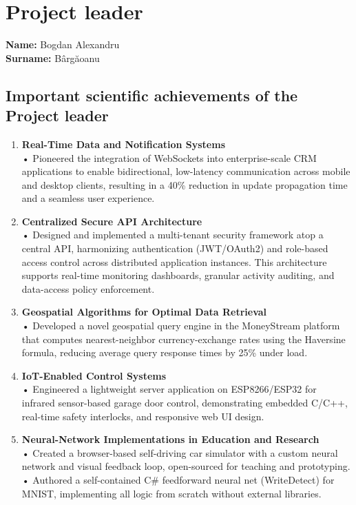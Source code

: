 \chapter{Project leader}

\noindent
\textbf{Name:} Bogdan Alexandru\\
\textbf{Surname:} Bârgăoanu

\section{Important scientific achievements of the Project leader}

\begin{enumerate}
    \item \textbf{Real-Time Data and Notification Systems} \\
    • Pioneered the integration of WebSockets into enterprise-scale CRM applications to enable bidirectional, low-latency communication across mobile and desktop clients, resulting in a 40\% reduction in update propagation time and a seamless user experience.

    \item \textbf{Centralized Secure API Architecture} \\
    • Designed and implemented a multi-tenant security framework atop a central API, harmonizing authentication (JWT/OAuth2) and role-based access control across distributed application instances. This architecture supports real-time monitoring dashboards, granular activity auditing, and data-access policy enforcement.

    \item \textbf{Geospatial Algorithms for Optimal Data Retrieval} \\
    • Developed a novel geospatial query engine in the MoneyStream platform that computes nearest-neighbor currency-exchange rates using the Haversine formula, reducing average query response times by 25\% under load.

    \item \textbf{IoT-Enabled Control Systems} \\
    • Engineered a lightweight server application on ESP8266/ESP32 for infrared sensor-based garage door control, demonstrating embedded C/C++, real-time safety interlocks, and responsive web UI design.

    \item \textbf{Neural-Network Implementations in Education and Research} \\
    • Created a browser-based self-driving car simulator with a custom neural network and visual feedback loop, open-sourced for teaching and prototyping. \\
    • Authored a self-contained C\# feedforward neural net (WriteDetect) for MNIST, implementing all logic from scratch without external libraries.
\end{enumerate}

